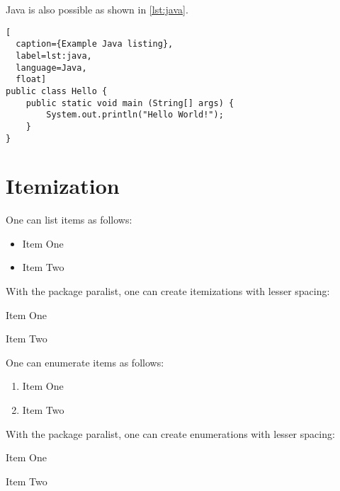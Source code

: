 \documentclass[
  fontsize=10pt
  numbers=noenddot,
  english,  %
  paper=a5,
  twoside,  %
  DIV=calc,
  headings=small,
  bibliography=totoc,
  listof=totoc,
  draft=false
]{scrbook}
\theoremstyle{break}
\begin{document}
Java is also possible as shown in \cref{lst:java}.

\begin{ltgexample}
\begin{lstlisting}[
  caption={Example Java listing},
  label=lst:java,
  language=Java,
  float]
public class Hello {
    public static void main (String[] args) {
        System.out.println("Hello World!");
    }
}
\end{lstlisting}
\end{ltgexample}

\section{Itemization}

One can list items as follows:

\begin{ltgexample}
\begin{itemize}
\item Item One
\item Item Two
\end{itemize}
\end{ltgexample}

With the package paralist, one can create itemizations with lesser spacing:

\begin{ltgexample}
\begin{compactitem}
\item Item One
\item Item Two
\end{compactitem}
\end{ltgexample}

One can enumerate items as follows:

\begin{ltgexample}
\begin{enumerate}
  \item Item One
  \item Item Two
\end{enumerate}
\end{ltgexample}

With the package paralist, one can create enumerations with lesser spacing:

\begin{ltgexample}
\begin{compactenum}
  \item Item One
  \item Item Two
\end{compactenum}
\end{ltgexample}
\end{document}
